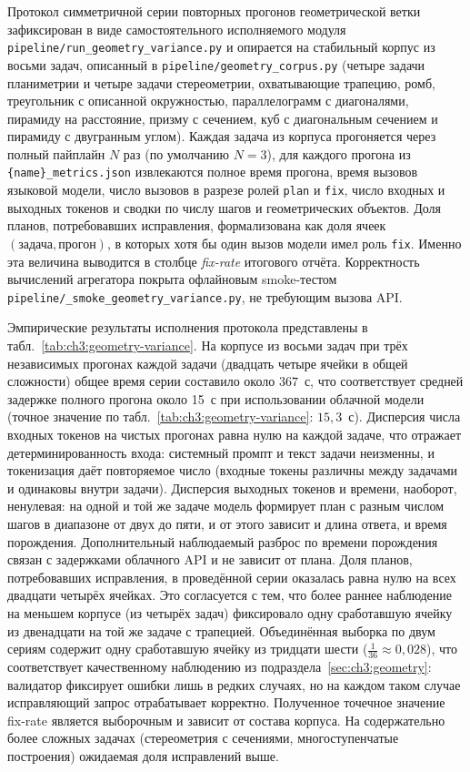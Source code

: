 Протокол симметричной серии повторных прогонов геометрической ветки зафиксирован в виде самостоятельного исполняемого модуля \texttt{pipeline/run\_geometry\_variance.py} и опирается на стабильный корпус из восьми задач, описанный в \texttt{pipeline/geometry\_corpus.py} (четыре задачи планиметрии и четыре задачи стереометрии, охватывающие трапецию, ромб, треугольник с описанной окружностью, параллелограмм с диагоналями, пирамиду на расстояние, призму с сечением, куб с диагональным сечением и пирамиду с двугранным углом). Каждая задача из корпуса прогоняется через полный пайплайн \(N\) раз (по умолчанию \(N = 3\)), для каждого прогона из \texttt{\{name\}\_metrics.json} извлекаются полное время прогона, время вызовов языковой модели, число вызовов в разрезе ролей \texttt{plan} и \texttt{fix}, число входных и выходных токенов и сводки по числу шагов и геометрических объектов. Доля планов, потребовавших исправления, формализована как доля ячеек \((\text{задача}, \text{прогон})\), в которых хотя бы один вызов модели имел роль \texttt{fix}. Именно эта величина выводится в столбце \emph{fix-rate} итогового отчёта. Корректность вычислений агрегатора покрыта офлайновым smoke\nobreakdash-тестом \texttt{pipeline/\_smoke\_geometry\_variance.py}, не требующим вызова API.

Эмпирические результаты исполнения протокола представлены в табл.~\ref{tab:ch3:geometry-variance}. На корпусе из восьми задач при трёх независимых прогонах каждой задачи (двадцать четыре ячейки в общей сложности) общее время серии составило около \(367\)~с, что соответствует средней задержке полного прогона около 15~с при использовании облачной модели  (точное значение по табл.~\ref{tab:ch3:geometry-variance}: \(15{,}3\)~с). Дисперсия числа входных токенов на чистых прогонах равна нулю на каждой задаче, что отражает детерминированность входа: системный промпт и текст задачи неизменны, и токенизация даёт повторяемое число (входные токены различны между задачами и одинаковы внутри задачи). Дисперсия выходных токенов и времени, наоборот, ненулевая: на одной и той же задаче модель формирует план с разным числом шагов в диапазоне от двух до пяти, и от этого зависит и длина ответа, и время порождения. Дополнительный наблюдаемый разброс по времени порождения связан с задержками облачного API и не зависит от плана. Доля планов, потребовавших исправления, в проведённой серии оказалась равна нулю на всех двадцати четырёх ячейках. Это согласуется с тем, что более раннее наблюдение на меньшем корпусе (из четырёх задач) фиксировало одну сработавшую ячейку из двенадцати на той же задаче с трапецией. Объединённая выборка по двум сериям содержит одну сработавшую ячейку из тридцати шести (\(\tfrac{1}{36} \approx 0{,}028\)), что соответствует качественному наблюдению из подраздела~\ref{sec:ch3:geometry}: валидатор фиксирует ошибки лишь в редких случаях, но на каждом таком случае исправляющий запрос отрабатывает корректно. Полученное точечное значение fix-rate является выборочным и зависит от состава корпуса. На содержательно более сложных задачах (стереометрия с сечениями, многоступенчатые построения) ожидаемая доля исправлений выше.

